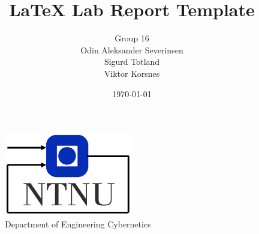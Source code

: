 \documentclass[11pt, a4paper, USenglish]{article} %
\begin{document}
\title{LaTeX Lab Report Template}
\author{Group 16\\Odin Aleksander Severinsen\\Sigurd Totland\\Viktor Korsnes}
\date{\today}
\begin{titlepage}
    \maketitle
    \begin{figure}
    \centering
    \includegraphics[width=0.5\textwidth]{figures/itk_ntnu}\\
    Department of Engineering Cybernetics
    \end{figure}
    \thispagestyle{empty}
\end{titlepage}

\newpage

\thispagestyle{empty} %

\newpage
\tableofcontents
\thispagestyle{empty} %

\newpage
\setcounter{page}{1}









\newpage
{}
\printbibliography{}
\label{sec:bibliography}
\end{document}
